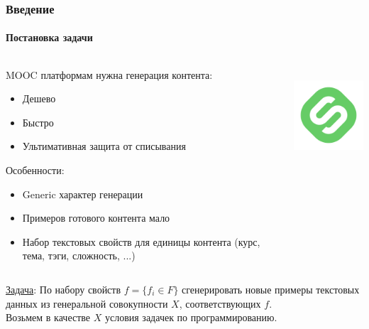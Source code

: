 \documentclass[10pt]{beamer}
\begin{document}
\begin{frame}
\frametitle{Введение}
\framesubtitle{Постановка задачи}

\begin{columns}
    \begin{column}{0.7\textwidth}
        MOOC платформам нужна генерация контента:
        \begin{itemize}
            \item Дешево
            \item Быстро
            \item Ультимативная защита от списывания
        \end{itemize}
        
        Особенности:
        \begin{itemize}
            \item Generic характер генерации
            \item Примеров готового контента мало
            \item Набор текстовых свойств для единицы контента (курс, тема, тэги, сложность, ...)
        \end{itemize}
    \end{column}
    \begin{column}{0.3\textwidth}
        \begin{center}
            \includegraphics[height=3.5cm]{images/stepik.png}
        \end{center}
    \end{column}
\end{columns}

\vskip4mm

\underline{Задача}: По набору свойств $f = \{f_i \in F\}$ сгенерировать новые примеры текстовых данных из генеральной совокупности $X$, соответствующих $f$. \\
Возьмем в качестве $X$ условия задачек по программированию.

\end{frame}
\end{document}
